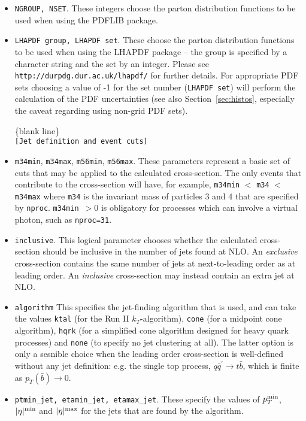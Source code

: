 \documentclass[12pt]{article}
\begin{document}
\begin{itemize}
\item {\tt NGROUP, NSET}. These integers choose the parton distribution
functions to be used when using the PDFLIB package.
\item {\tt LHAPDF group, LHAPDF set}. These choose the parton
distribution functions to be used when using the LHAPDF package --
the group is specified by a character string and the set by an integer.
Please see {\tt http://durpdg.dur.ac.uk/lhapdf/} for further details.
For appropriate PDF sets choosing a value of -1 for the set number ({\tt  LHAPDF set}) 
will perform the calculation of the PDF uncertainties (see also
Section~\ref{sec:histos}, especially the caveat regarding using
non-grid PDF sets).

\begin{center}
\{blank line\} \\
{\tt [Jet definition and event cuts] }
\end{center}

\item {\tt m34min}, {\tt m34max}, {\tt m56min}, {\tt m56max}.
These parameters represent a basic set of cuts that may be applied
to the calculated cross-section. The only events that contribute to
the cross-section will have, for example,
{\tt m34min} $<$ {\tt m34} $<$ {\tt m34max} where {\tt m34} is the
invariant mass of particles 3 and 4 that are specified by {\tt nproc}.
{\tt m34min}~$> 0$ is obligatory for processes which can involve a virtual
photon, such as {\tt nproc=31}.
\item {\tt inclusive}.  This logical parameter chooses whether the
calculated cross-section should be inclusive in the number of jets
found at NLO. An {\em exclusive}
cross-section contains the same number of jets at next-to-leading
order as at leading order. An {\em inclusive} cross-section may
instead contain an extra jet at NLO.

\item {\tt algorithm} This specifies the jet-finding algorithm that
is used, and can take the values
{\tt ktal} (for the Run II $k_T$-algorithm), {\tt cone} (for
a midpoint cone algorithm), {\tt hqrk} (for a simplified cone
algorithm designed for heavy quark processes) and {\tt none} (to
specify no jet clustering at all). The latter option is only a
sesnible choice when the leading order cross-section is well-defined
without any jet definition: e.g. the single top process,
$q{\bar q^\prime} \to t{\bar b}$, which is finite as
$p_T({\bar b}) \to 0$.

\item {\tt ptmin\_jet, etamin\_jet, etamax\_jet}. These specify the values
of $p_T^{\rm min}$, $|\eta|^{\rm min}$ and $|\eta|^{\rm max}$ for the
jets that are found by the algorithm. 


\end{itemize}
\end{document}
